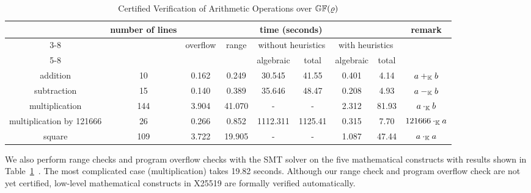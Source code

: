\begin{table*}[ht]
  \caption{Certified Verification of Arithmetic Operations over
    $\mathbb{GF}(\varrho)$}
  \centering
  \begin{tabular}{|c|c|c|c|c|c|c|c|c|}
    \hline
    \multirow{3}{*}{} & \multirow{3}{*}{number of lines} & \multicolumn{6}{|c|}{time (seconds)} & \multirow{3}{*}{remark} \\ \cline{3-8}
    & & \multirow{2}{*}{overflow} & \multirow{2}{*}{range} & \multicolumn{2}{|c|}{without heuristics} & \multicolumn{2}{|c|}{with heuristics} & \\ \cline{5-8}
    & & & & algebraic & total & algebraic & total & \\
    \hline
    addition                 & 10  & 0.162 & 0.249 & 30.545 & 41.55 & 0.401 & 4.14 & $a +_{\mathbb{K}} b$ \\
    \hline
    subtraction              & 15  & 0.140 & 0.389 & 35.646 & 48.47 & 0.208 & 4.93 & $a -_{\mathbb{K}} b$ \\
    \hline
    multiplication           & 144 & 3.904 & 41.070 & - & - & 2.312 & 81.93 & $a \cdot_{\mathbb{K}} b$\\
    \hline
    multiplication by 121666 & 26  & 0.266 & 0.852 & 1112.311 & 1125.41 & 0.315 & 7.70 & $121666 \cdot_{\mathbb{K}} a$\\
    \hline
    square                   & 109 & 3.722 & 19.905  & - & - & 1.087 & 47.44 & $a \cdot_{\mathbb{K}} a$\\
    \hline
  \end{tabular}
  \label{table:arithmetic-operations}
\end{table*}


We also perform range checks and program overflow checks with the SMT solver \boolector on the
five mathematical constructs with results shown in Table~\ref{table:arithmetic-operations}~\cite{boolector}. The most complicated case (multiplication) takes 19.82 seconds.
Although our range check and program overflow check are not yet certified, low-level
mathematical constructs in X25519 are formally verified automatically.

